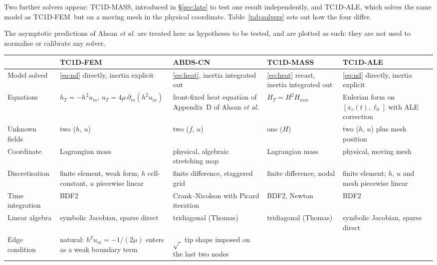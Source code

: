 \documentclass[11pt,a4paper]{article}
\newcommand{\TC}{\textsf{TC1D-FEM}}
\newcommand{\AB}{\textsf{ABDS-CN}}
\begin{document}
Two further solvers appear: \textsf{TC1D-MASS}, introduced in \S\ref{sec:late}
to test one result independently, and \textsf{TC1D-ALE}, which solves the same
model as \TC\ but on a moving mesh in the physical coordinate.
Table~\ref{tab:solvers} sets out how the four differ.

The asymptotic predictions of Ahsan \textit{et al.} \cite{ahsan2025} are treated here as
hypotheses to be tested, and are plotted as such: they are not used to
normalise or calibrate any solver.

\begin{table}[htbp]
  \centering
  \small
  \begin{tabular}{@{}p{}p{}p{}p{}p{}@{}}
  \toprule
   & \TC & \AB & \textsf{TC1D-MASS} & \textsf{TC1D-ALE} \\
  \midrule
  Model solved
    & \eqref{eq:nd} directly, inertia explicit
    & \eqref{eq:heat}, inertia integrated out
    & \eqref{eq:heat} recast, inertia integrated out
    & \eqref{eq:nd} directly, inertia explicit \\[2pt]
  Equations
    & $h_T = -h^2 u_m$, \newline $u_T = 4\mu\,\partial_m(h^2 u_m)$
    & front-fixed heat equation of Appendix~D of Ahsan \textit{et al.} \cite{ahsan2025}
    & $H_T = H^2 H_{mm}$
    & Eulerian form on $[x_c(t), \ell_0]$ with ALE correction \\[2pt]
  Unknown fields
    & two ($h$, $u$)
    & two ($f$, $u$)
    & one ($H$)
    & two ($h$, $u$) plus mesh position \\[2pt]
  Coordinate
    & Lagrangian mass
    & physical, algebraic stretching map
    & Lagrangian mass
    & physical, moving mesh \\[2pt]
  Discretisation
    & finite element, weak form; $h$ cell-constant, $u$ piecewise linear
    & finite difference, staggered grid
    & finite difference, nodal
    & finite element; $h$, $u$ and mesh piecewise linear \\[2pt]
  Time integration
    & BDF2
    & Crank--Nicolson with Picard iteration
    & BDF2, Newton
    & BDF2 \\[2pt]
  Linear algebra
    & symbolic Jacobian, sparse direct
    & tridiagonal (Thomas)
    & tridiagonal (Thomas)
    & symbolic Jacobian, sparse direct \\[2pt]
  Edge condition
    & natural: $h^{2} u_{m} = -1/(2\mu)$ enters as a weak boundary term
    & $\sqrt{\;}$ tip shape imposed on the last two nodes

\end{tabular}
\end{table}
\end{document}
